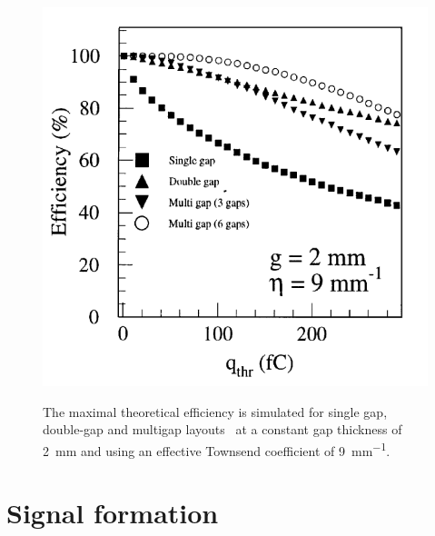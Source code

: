 	\begin{figure}[H]
		\centering
		\includegraphics[width = 0.6\plotwidth]{fig/chapt4/Layout_eff_vs_thr.png}\\
		\caption{\label{fig:EffThreshold} The maximal theoretical efficiency is simulated for single gap, double-gap and multigap layouts~\cite{ABBRESCIA99} at a constant gap thickness of \SI{2}{mm} and using an effective Townsend coefficient of \SI{9}{mm^{-1}}.}
	\end{figure}

\section{Signal formation}
\label{chapt4:sec:signal}
	
